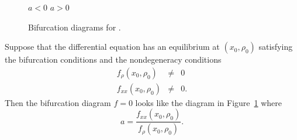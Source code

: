 \documentclass{ximera}
\begin{document}
\begin{figure}[htb]
           \centerline{%
	    \qquad \qquad
	   }
	 \hspace{1.0in} $a<0$ \hspace{2.8in}  $a>0$  
           \caption{Bifurcation diagrams for \protect{}.}
           \label{F:1dsaddle}
\end{figure}

\begin{thm}  \label{T:saddlenode} 
Suppose that the differential equation  has an equilibrium
at $(x_0,\rho_0)$ satisfying the bifurcation conditions 
and the nondegeneracy conditions
\begin{equation}  \label{e:nondegen1}
\begin{array}{rcl} 
f_\rho(x_0,\rho_0) & \neq & 0 \\
f_{xx}(x_0,\rho_0) & \neq & 0. 
\end{array}
\end{equation}
Then the bifurcation diagram $f=0$ looks like the diagram in 
Figure~\ref{F:1dsaddle} where 
\[
a = \frac{f_{xx}(x_0,\rho_0)}{f_\rho(x_0,\rho_0)}.
\]
\end{thm}
\end{document}
